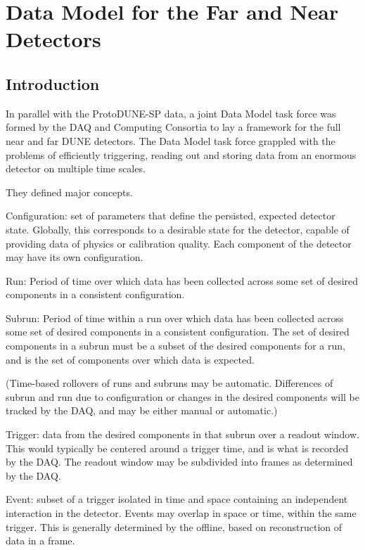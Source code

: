 \section{Data Model for the Far and Near Detectors}
\label{ch:exec-comp-mod}

\subsection{Introduction}
\label{ch:exec-comp-mod-int}
In parallel with the ProtoDUNE-SP data, a joint Data Model task force was formed by the DAQ and Computing Consortia to lay a framework for the full near and far DUNE detectors. 
The Data Model task force grappled with the problems of efficiently triggering, reading out and storing data from an enormous detector on multiple time scales.

They defined major concepts.

\begin{description}

\item{Configuration:} set of parameters that define the persisted, expected detector state. Globally, this corresponds to a desirable state for the detector, capable of providing data of physics or calibration quality. Each component of the detector may have its own configuration.
 
\item{Run:} Period of time over which data has been collected across some set of desired components in a consistent configuration.
 
\item{Subrun:} Period of time within a run over which data has been collected across some set of desired components in a consistent configuration. The set of desired components in a subrun must be a subset of the desired components for a run, and is the set of components over which data is expected.
 
(Time-based rollovers of runs and subruns may be automatic. Differences of subrun and run due to configuration or changes in the desired components will be tracked by the DAQ, and may be either manual or automatic.)
 
\item{Trigger:} data from the desired components in that subrun over a readout window. This would typically be centered around a trigger time, and is what is recorded by the DAQ. The readout window may be subdivided into frames as determined by the DAQ.
 
\item{Event:} subset of a trigger isolated in time and space containing an independent interaction in the detector. Events may overlap in space or time, within the same trigger. This is generally determined by the offline, based on reconstruction of data in a frame.

\end{description}


